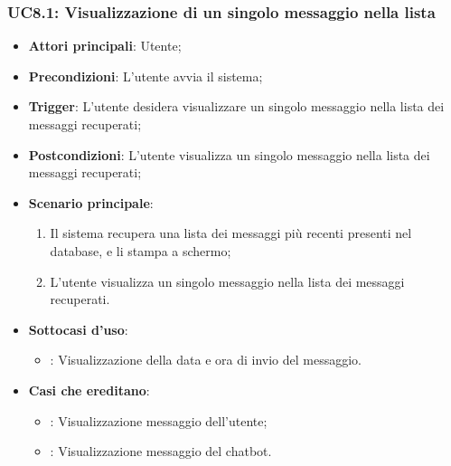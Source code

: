 \hypertarget{UC8.1}{}
\subsubsection{UC8.1: Visualizzazione di un singolo messaggio nella lista}
\begin{itemize}
    \item \textbf{Attori principali}: Utente;
    \item \textbf{Precondizioni}: L'utente avvia il sistema;
    \item \textbf{Trigger}: L'utente desidera visualizzare un singolo messaggio nella lista dei messaggi recuperati;
    \item \textbf{Postcondizioni}: L'utente visualizza un singolo messaggio nella lista dei messaggi recuperati;
    \item \textbf{Scenario principale}:
    \begin{enumerate}
        \item Il sistema recupera una lista dei messaggi più recenti presenti nel database, e li stampa a schermo;
        \item L'utente visualizza un singolo messaggio nella lista dei messaggi recuperati.
    \end{enumerate}
    \item \textbf{Sottocasi d'uso}:
    \begin{itemize}
        \item {}: Visualizzazione della data e ora di invio del messaggio.
    \end{itemize}
    \item \textbf{Casi che ereditano}:
    \begin{itemize}
        \item {}: Visualizzazione messaggio dell'utente;
        \item {}: Visualizzazione messaggio del chatbot.
    \end{itemize}
\end{itemize}

\hypertarget{UC8.2}{}
